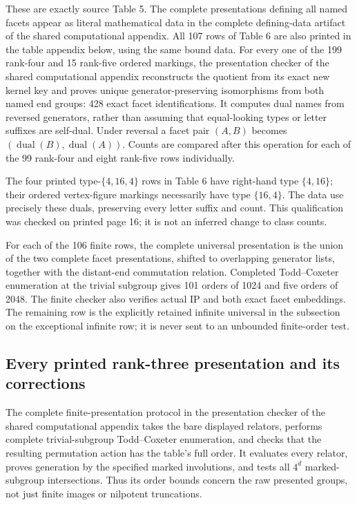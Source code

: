 These are exactly source Table 5. The complete presentations defining all named facets appear as literal mathematical data in the complete defining-data artifact of the shared computational appendix. All 107 rows of Table 6 are also printed in the table appendix below, using the same bound data. For every one of the 199 rank-four and 15 rank-five ordered markings, the presentation checker of the shared computational appendix reconstructs the quotient from its exact new kernel key and proves unique generator-preserving isomorphisms from both named end groups: 428 exact facet identifications. It computes dual names from reversed generators, rather than assuming that equal-looking types or letter suffixes are self-dual. Under reversal a facet pair \((A,B)\) becomes \((\operatorname{dual}(B),\operatorname{dual}(A))\). Counts are compared after this operation for each of the 99 rank-four and eight rank-five rows individually.

The four printed type-\(\{4,16,4\}\) rows in Table 6 have right-hand type \(\{4,16\}\); their ordered vertex-figure markings necessarily have type \(\{16,4\}\). The data use precisely these duals, preserving every letter suffix and count. This qualification was checked on printed page 16; it is not an inferred change to class counts.

For each of the 106 finite rows, the complete universal presentation is the union of the two complete facet presentations, shifted to overlapping generator lists, together with the distant-end commutation relation. Completed Todd--Coxeter enumeration at the trivial subgroup gives 101 orders of 1024 and five orders of 2048. The finite checker also verifies actual IP and both exact facet embeddings. The remaining row is the explicitly retained infinite universal in the subsection on the exceptional infinite row; it is never sent to an unbounded finite-order test.

\subsection{Every printed rank-three presentation and its corrections}\label{every-printed-rank-three-presentation-and-its-corrections}

The complete finite-presentation protocol in the presentation checker of the shared computational appendix takes the bare displayed relators, performs complete trivial-subgroup Todd--Coxeter enumeration, and checks that the resulting permutation action has the table's full order. It evaluates every relator, proves generation by the specified marked involutions, and tests all \(4^{d}\) marked-subgroup intersections. Thus its order bounds concern the raw presented groups, not just finite images or nilpotent truncations.

